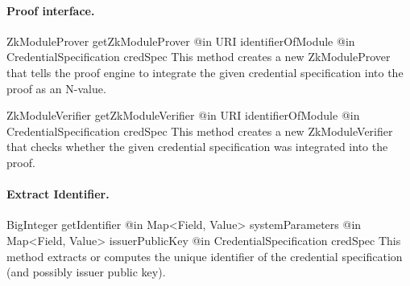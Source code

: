     \paragraph{Proof interface.}
      \begin{method}
      {ZkModuleProver}
      {getZkModuleProver}
      {
        {@in URI identifierOfModule}
        {@in CredentialSpecification credSpec}
      }
      This method creates a new ZkModuleProver that tells the proof engine to
      integrate the given credential specification into the proof as an N-value.
      \end{method}
      \begin{method}
      {ZkModuleVerifier}
      {getZkModuleVerifier}
      {
        {@in URI identifierOfModule}
        {@in CredentialSpecification credSpec}
      }
      This method creates a new ZkModuleVerifier that checks whether the
      given credential specification was integrated into the proof.
      \end{method}

    \paragraph{Extract Identifier.}
      \begin{method}
      {BigInteger}
      {getIdentifier}
      {
        {@in Map<Field, Value> systemParameters}
        {@in Map<Field, Value> issuerPublicKey}
        {@in CredentialSpecification credSpec}
      }
      This method extracts or computes the unique identifier of the credential specification
      (and possibly issuer public key).
      \end{method}
